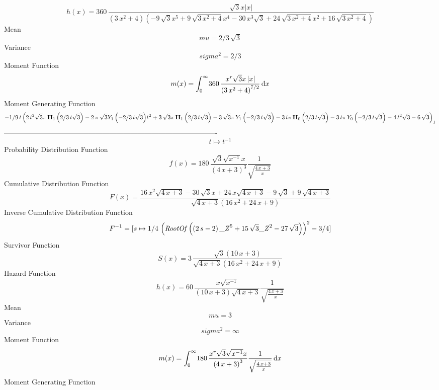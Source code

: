 \documentclass[12pt]{article}
\begin{document}
 $$ h(x)=360\,{\frac {\sqrt {3}x \left| x \right| }{ \left( 3\,{x}^{2}+4
 \right)  \left( -9\,\sqrt {3}{x}^{5}+9\,\sqrt {3\,{x}^{2}+4}{x}^{4}-
30\,{x}^{3}\sqrt {3}+24\,\sqrt {3\,{x}^{2}+4}{x}^{2}+16\,\sqrt {3\,{x}
^{2}+4} \right) }}
$$Mean 
 $$ mu=2/3\,\sqrt {3}
$$ Variance 
 $$ sigma^2 = 2/3
$$Moment Function 
 $$ m(x) = \int_{0}^{\infty }\!360\,{\frac {{x}^{r}\sqrt {3}x \left| x \right| }{
 \left( 3\,{x}^{2}+4 \right) ^{7/2}}}\,{\rm d}x
$$ Moment Generating Function 
 $$-1/9\,t \left( 2\,{t}^{2}\sqrt {3}\pi\,{{\rm \bf H}_{1}\left(2/3\,t
\sqrt {3}\right)}-2\,\pi\,\sqrt {3}{{\sl Y}_{1}\left(-2/3\,t\sqrt {3}
\right)}{t}^{2}+3\,\sqrt {3}\pi\,{{\rm \bf H}_{1}\left(2/3\,t\sqrt {3}
\right)}-3\,\sqrt {3}\pi\,{{\sl Y}_{1}\left(-2/3\,t\sqrt {3}\right)}-3
\,t\pi\,{{\rm \bf H}_{0}\left(2/3\,t\sqrt {3}\right)}-3\,t\pi\,{
{\sl Y}_{0}\left(-2/3\,t\sqrt {3}\right)}-4\,{t}^{2}\sqrt {3}-6\,
\sqrt {3} \right) _{{1}}
$$-------------------------------------------------------------------------------------------  \\$$t\mapsto {t}^{-1}
$$Probability Distribution Function 
$$  f(x)=180\,{\frac {\sqrt {3}\sqrt {{x}^{-1}}x}{ \left( 4\,x+3 \right) ^{3}}{
\frac {1}{\sqrt {{\frac {4\,x+3}{x}}}}}}
$$Cumulative Distribution Function  
 $$F(x)={\frac {16\,{x}^{2}\sqrt {4\,x+3}-30\,\sqrt {3}x+24\,x\sqrt {4\,x+3}-9
\,\sqrt {3}+9\,\sqrt {4\,x+3}}{\sqrt {4\,x+3} \left( 16\,{x}^{2}+24\,x
+9 \right) }}
$$ Inverse Cumulative Distribution Function 
  $$F^{-1} = [s\mapsto 1/4\, \left( {\it RootOf} \left(  \left( 2\,s-2 \right) {{
\it \_Z}}^{5}+15\,\sqrt {3}{{\it \_Z}}^{2}-27\,\sqrt {3} \right) 
 \right) ^{2}-3/4]
$$Survivor Function 
 $$ S(x)=3\,{\frac {\sqrt {3} \left( 10\,x+3 \right) }{\sqrt {4\,x+3} \left( 16
\,{x}^{2}+24\,x+9 \right) }}
$$ Hazard Function 
 $$ h(x)=60\,{\frac {x\sqrt {{x}^{-1}}}{ \left( 10\,x+3 \right) \sqrt {4\,x+3}}
{\frac {1}{\sqrt {{\frac {4\,x+3}{x}}}}}}
$$Mean 
 $$ mu=3
$$ Variance 
 $$ sigma^2 = \infty 
$$Moment Function 
 $$ m(x) = \int_{0}^{\infty }\!180\,{\frac {{x}^{r}\sqrt {3}\sqrt {{x}^{-1}}x}{
 \left( 4\,x+3 \right) ^{3}}{\frac {1}{\sqrt {{\frac {4\,x+3}{x}}}}}}
\,{\rm d}x
$$ Moment Generating Function 
\end{document}
